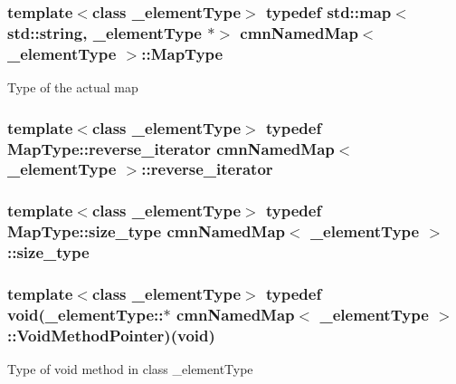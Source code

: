 \hypertarget{classcmn_named_map_a35919ad9cccf3e060063b489db663425}{
\subsubsection[{Map\-Type}]{\setlength{\rightskip}{0pt plus 5cm}template$<$class \-\_\-element\-Type$>$ typedef std\-::map$<$std\-::string, \-\_\-element\-Type $\ast$$>$ {\bf cmn\-Named\-Map}$<$ \-\_\-element\-Type $>$\-::{\bf Map\-Type}}}\label{classcmn_named_map_a35919ad9cccf3e060063b489db663425}
Type of the actual map \hypertarget{classcmn_named_map_abfbc3bd1bf3e0ea32fcdf61db4377014}{
\subsubsection[{reverse\-\_\-iterator}]{\setlength{\rightskip}{0pt plus 5cm}template$<$class \-\_\-element\-Type$>$ typedef Map\-Type\-::reverse\-\_\-iterator {\bf cmn\-Named\-Map}$<$ \-\_\-element\-Type $>$\-::{\bf reverse\-\_\-iterator}}}\label{classcmn_named_map_abfbc3bd1bf3e0ea32fcdf61db4377014}
\hypertarget{classcmn_named_map_aaaf5963f1e9b26efb08e7f0cd7199335}{
\subsubsection[{size\-\_\-type}]{\setlength{\rightskip}{0pt plus 5cm}template$<$class \-\_\-element\-Type$>$ typedef Map\-Type\-::size\-\_\-type {\bf cmn\-Named\-Map}$<$ \-\_\-element\-Type $>$\-::{\bf size\-\_\-type}}}\label{classcmn_named_map_aaaf5963f1e9b26efb08e7f0cd7199335}
\hypertarget{classcmn_named_map_a00103a8e6e3c75f6eeabcc3a0657521c}{
\subsubsection[{Void\-Method\-Pointer}]{\setlength{\rightskip}{0pt plus 5cm}template$<$class \-\_\-element\-Type$>$ typedef void(\-\_\-element\-Type\-::$\ast$ {\bf cmn\-Named\-Map}$<$ \-\_\-element\-Type $>$\-::Void\-Method\-Pointer)(void)}}\label{classcmn_named_map_a00103a8e6e3c75f6eeabcc3a0657521c}
Type of void method in class \-\_\-element\-Type 

